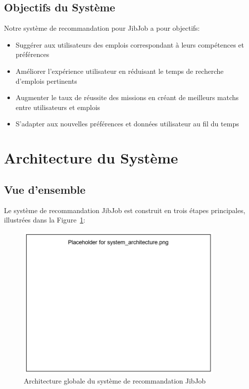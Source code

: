 \documentclass[12pt,a4paper]{article}
\begin{document}
\subsection{Objectifs du Système}
Notre système de recommandation pour JibJob a pour objectifs:
\begin{itemize}
    \item Suggérer aux utilisateurs des emplois correspondant à leurs compétences et préférences
    \item Améliorer l'expérience utilisateur en réduisant le temps de recherche d'emplois pertinents
    \item Augmenter le taux de réussite des missions en créant de meilleurs matchs entre utilisateurs et emplois
    \item S'adapter aux nouvelles préférences et données utilisateur au fil du temps
\end{itemize}

\section{Architecture du Système}
\subsection{Vue d'ensemble}

Le système de recommandation JibJob est construit en trois étapes principales, illustrées dans la Figure~\ref{fig:architecture}:

\begin{figure}[H]
    \centering
    \includegraphics[width=0.9\textwidth]{images/system_architecture.png}
    \caption{Architecture globale du système de recommandation JibJob}
    \label{fig:architecture}
\end{figure}
\end{document}
